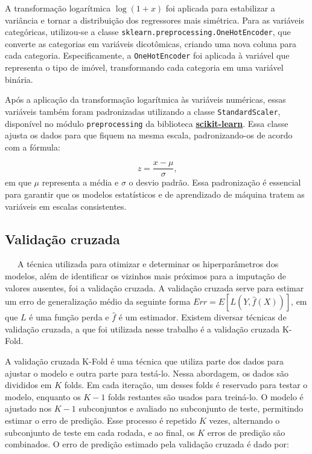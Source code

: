 \documentclass[
  12pt,
  a4paper,
]{scrreprt}
\begin{document}
\vspace{12pt}

A transformação logarítmica \(\log(1 + x)\) foi aplicada para
estabilizar a variância e tornar a distribuição dos regressores mais
simétrica. Para as variáveis categóricas, utilizou-se a classe
\texttt{sklearn.preprocessing.OneHotEncoder}, que converte as categorias
em variáveis dicotômicas, criando uma nova coluna para cada categoria.
Especificamente, a \texttt{OneHotEncoder} foi aplicada à variável que
representa o tipo de imóvel, transformando cada categoria em uma
variável binária.

\vspace{12pt}

Após a aplicação da transformação logarítmica às variáveis numéricas,
essas variáveis também foram padronizadas utilizando a classe
\texttt{StandardScaler}, disponível no módulo \texttt{preprocessing} da
biblioteca
\href{https://scikit-learn.org/stable/}{\textbf{scikit-learn}}. Essa
classe ajusta os dados para que fiquem na mesma escala, padronizando-os
de acordo com a fórmula:

\[
z = \frac{x - \mu}{\sigma}\text{,}
\] em que \(\mu\) representa a média e \(\sigma\) o desvio padrão. Essa
padronização é essencial para garantir que os modelos estatísticos e de
aprendizado de máquina tratem as variáveis em escalas consistentes.

\subsection{Validação cruzada}\label{validauxe7uxe3o-cruzada}

~~~A técnica utilizada para otimizar e determinar os hiperparâmetros dos
modelos, além de identificar os vizinhos mais próximos para a imputação
de valores ausentes, foi a validação cruzada. A validação cruzada serve
para estimar um erro de generalização médio da seguinte forma
\(Err = E\left[L\left(Y, \hat{f}\left(X\right)\right)\right]\), em que
\(L\) é uma função perda e \(\hat f\) é um estimador. Existem diversar
técnicas de validação cruzada, a que foi utilizada nesse trabalho é a
validação cruzada K-Fold.

\vspace{12pt}

A validação cruzada K-Fold é uma técnica que utiliza parte dos dados
para ajustar o modelo e outra parte para testá-lo. Nessa abordagem, os
dados são divididos em \(K\) folds. Em cada iteração, um desses folds é
reservado para testar o modelo, enquanto os \(K−1\) folds restantes são
usados para treiná-lo. O modelo é ajustado nos \(K−1\) subconjuntos e
avaliado no subconjunto de teste, permitindo estimar o erro de predição.
Esse processo é repetido \(K\) vezes, alternando o subconjunto de teste
em cada rodada, e ao final, os \(K\) erros de predição são combinados. O
erro de predição estimado pela validação cruzada é dado por:
\end{document}
